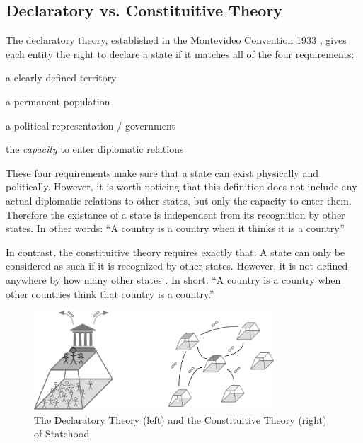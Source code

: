 \subsection{Declaratory vs. Constituitive Theory} %
\label{sub:declaratory_vs_constituitive_theory}

The declaratory theory, established in the Montevideo Convention 1933 \cite{MontevideoConvention}, gives each entity the right to declare a state if it matches all of the four requirements:
\begin{compactenum}
  \item a clearly defined territory
  \item a permanent population
  \item a political representation / government
  \item the \emph{capacity} to enter diplomatic relations
\end{compactenum}

These four requirements make sure that a state can exist physically and politically. However, it is worth noticing that this definition does not include any actual diplomatic relations to other states, but only the capacity to enter them. Therefore the existance of a state is independent from its recognition by other states. In other words: ``A country is a country when it thinks it is a country.''

In contrast, the constituitive theory requires exactly that: A state can only be considered as such if it is recognized by other states. However, it is not defined anywhere by how many other states \cite{StateTheory}. In short: ``A country is a country when other countries think that country is a country.'' \cite{greyCountries}

\begin{figure}[ht]
  \centering
  \includegraphics[width = 0.8\textwidth]{graphics/uncertainty/decl_const_theory}
  \caption{The Declaratory Theory (left) and the Constituitive Theory (right) of Statehood}
  \label{fig:declaratory_constituitive_theory}
\end{figure}

